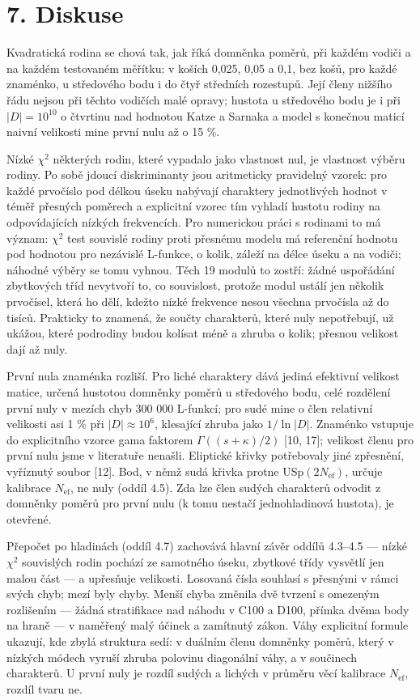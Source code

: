 \documentclass[
  10pt,
]{article}
\begin{document}
\hypertarget{diskuse}{%
\section{7. Diskuse}\label{diskuse}}

Kvadratická rodina se chová tak, jak říká domněnka poměrů, při každém
vodiči a na každém testovaném měřítku: v koších 0,025, 0,05 a 0,1, bez
košů, pro každé znaménko, u středového bodu i do čtyř středních
rozestupů. Její členy nižšího řádu nejsou při těchto vodičích malé
opravy; hustota u středového bodu je i při \(|D| = 10^{10}\) o čtvrtinu
nad hodnotou Katze a Sarnaka a model s konečnou maticí naivní velikosti
mine první nulu až o 15 \%.

Nízké \(\chi^2\) některých rodin, které vypadalo jako vlastnost nul, je
vlastnost výběru rodiny. Po sobě jdoucí diskriminanty jsou aritmeticky
pravidelný vzorek: pro každé prvočíslo pod délkou úseku nabývají
charaktery jednotlivých hodnot v téměř přesných poměrech a explicitní
vzorec tím vyhladí hustotu rodiny na odpovídajících nízkých frekvencích.
Pro numerickou práci s rodinami to má význam: \(\chi^2\) test souvislé
rodiny proti přesnému modelu má referenční hodnotu pod hodnotou pro
nezávislé L-funkce, o kolik, záleží na délce úseku a na vodiči; náhodné
výběry se tomu vyhnou. Těch 19 modulů to zostří: žádné uspořádání
zbytkových tříd nevytvoří to, co souvislost, protože modul ustálí jen
několik prvočísel, která ho dělí, kdežto nízké frekvence nesou všechna
prvočísla až do tisíců. Prakticky to znamená, že součty charakterů,
které nuly nepotřebují, už ukážou, které podrodiny budou kolísat méně a
zhruba o kolik; přesnou velikost dají až nuly.

První nula znaménka rozliší. Pro liché charaktery dává jediná efektivní
velikost matice, určená hustotou domněnky poměrů u středového bodu, celé
rozdělení první nuly v mezích chyb 300 000 L-funkcí; pro sudé mine o
člen relativní velikosti asi 1 \% při \(|D| \approx 10^6\), klesající
zhruba jako \(1/\ln|D|\). Znaménko vstupuje do explicitního vzorce gama
faktorem \(\Gamma((s + \kappa)/2)\) {[}10, 17{]}; velikost členu pro
první nulu jsme v literatuře nenašli. Eliptické křivky potřebovaly jiné
zpřesnění, vyříznutý soubor {[}12{]}. Bod, v němž sudá křivka protne
USp\((2N_{\mathrm{ef}})\), určuje kalibrace \(N_{\mathrm{ef}}\), ne nuly
(oddíl 4.5). Zda lze člen sudých charakterů odvodit z domněnky poměrů
pro první nulu (k tomu nestačí jednohladinová hustota), je otevřené.

Přepočet po hladinách (oddíl 4.7) zachovává hlavní závěr oddílů 4.3--4.5
--- nízké \(\chi^2\) souvislých rodin pochází ze samotného úseku,
zbytkové třídy vysvětlí jen malou část --- a upřesňuje velikosti.
Losovaná čísla souhlasí s přesnými v rámci svých chyb; mezí byly chyby.
Menší chyba změnila dvě tvrzení s omezeným rozlišením --- žádná
stratifikace nad náhodu v C100 a D100, přímka dvěma body na hraně --- v
naměřený malý účinek a zamítnutý zákon. Váhy explicitní formule ukazují,
kde zbylá struktura sedí: v duálním členu domněnky poměrů, který v
nízkých módech vyruší zhruba polovinu diagonální váhy, a v součinech
charakterů. U první nuly je rozdíl sudých a lichých v průměru věcí
kalibrace \(N_{\mathrm{ef}}\), rozdíl tvaru ne.
\end{document}

